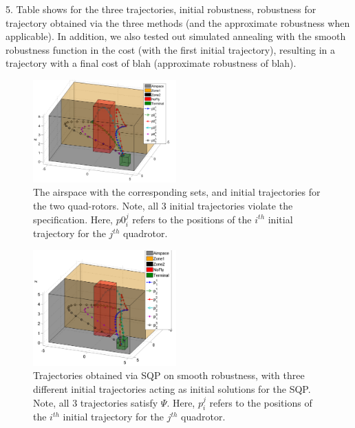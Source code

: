 5. Table shows for the three trajectories, initial robustness, robustness for trajectory obtained via the three methods (and the approximate robustness when applicable). In addition, we also tested out simulated annealing with the smooth robustness function in the cost (with the first initial trajectory), resulting in a trajectory with a final cost of blah (approximate robustness of blah).



\begin{figure}[t]
\centering
\includegraphics[width=0.49\textwidth]{figures/QuadInitTrajs_scissored}
\caption{The airspace with the corresponding sets, and initial trajectories for the two quad-rotors. Note, all 3 initial trajectories violate the specification. Here, $p0_{i}^j$ refers to the positions of the $i^{th}$ initial trajectory for the $j^{th}$ quadrotor.}
\label{fig:quad_init}
\end{figure}

\begin{figure}[t]
\centering
\includegraphics[width=0.49\textwidth]{figures/QuadTrajs_scissored}
\caption{ Trajectories obtained via SQP on smooth robustness, with three different initial trajectories acting as initial solutions for the SQP. Note, all 3 trajectories satisfy $\Psi$. Here, $p_{i}^j$ refers to the positions of the $i^{th}$ initial trajectory for the $j^{th}$ quadrotor.}
\label{fig:quad_init}
\end{figure}
